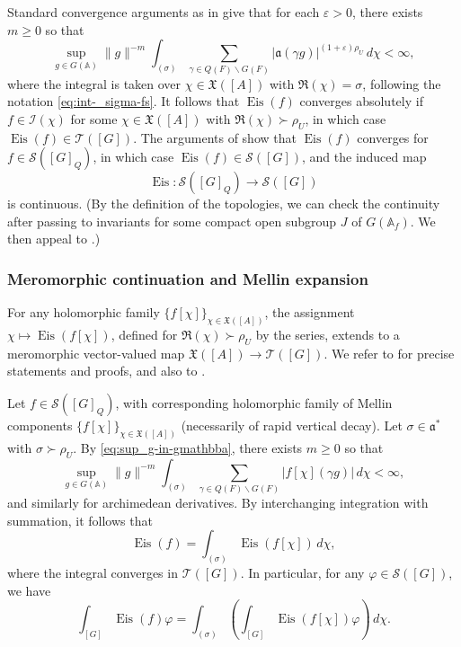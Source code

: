 \documentclass[reqno]{amsart}
\def\eps{\varepsilon}
\DeclareMathOperator{\Eis}{Eis}
\theoremstyle{plain} \newtheorem{theorem} {Theorem}
\theoremstyle{definition} \newtheorem{definition} [theorem] {Definition}
\theoremstyle{itplain} %
\numberwithin{equation}{section}
\numberwithin{theorem}{section}
\renewcommand{\geq}{\geqslant}
\begin{document}
Standard convergence arguments as in \cite[\S12]{MR2331343} give that for each $\eps > 0$, there exists $m \geq 0$ so that
\begin{equation}\label{eq:sup_g-in-gmathbba}
  \sup_{g \in G(\mathbb{A})} \|g\|^{-m}
  \int_{ (\sigma)
  }
  \sum_{\gamma \in Q(F) \backslash G(F)} |\mathfrak{a}(\gamma g)|^{(1+\eps) \rho_U} \, d \chi < \infty,
\end{equation}
where the integral is taken over $\chi \in \mathfrak{X}([A])$ with $\Re(\chi) = \sigma$, following the notation \eqref{eq:int-_sigma-fs}.  It follows that $\Eis(f)$ converges absolutely if $f \in \mathcal{I}(\chi)$ for some $\chi \in \mathfrak{X}([A])$ with $\Re(\chi) \succ \rho_U$, in which case $\Eis(f) \in \mathcal{T}([G])$.  \index{Eisenstein series!spectral, $\Eis(f)$} The arguments of \cite[\S II.1.7, II.1.10]{MR1361168} show that $\Eis(f)$ converges for $f \in \mathcal{S}([G]_Q)$, in which case $\Eis(f) \in \mathcal{S}([G])$, and the induced map
\begin{equation*}
  \Eis : \mathcal{S}([G]_Q) \rightarrow \mathcal{S}([G])
\end{equation*}
is continuous.  (By the definition of the topologies, we can check the continuity after passing to invariants for some compact open subgroup $J$ of $G(\mathbb{A}_f)$.  We then appeal to \cite[Prop 1.13]{MR1001613}.)

\subsubsection{Meromorphic continuation and Mellin expansion}
For any holomorphic family $\{f[\chi]\}_{\chi \in \mathfrak{X}([A])}$, the assignment $\chi \mapsto \Eis(f[\chi])$, defined for $\Re(\chi) \succ \rho_U$ by the series, extends to a meromorphic vector-valued map $\mathfrak{X}([A]) \rightarrow \mathcal{T}([G])$.  We refer to \cite{MR2402686} for precise statements and proofs, and also to \cite[Thm 11.7]{MR3219530}.

Let $f \in \mathcal{S}([G]_Q)$, with corresponding holomorphic family of Mellin components $\{f[\chi]\}_{\chi \in \mathfrak{X}([A])}$ (necessarily of rapid vertical decay).  Let $\sigma \in \mathfrak{a}^*$ with $\sigma \succ \rho_U$.  By \eqref{eq:sup_g-in-gmathbba}, there exists $m \geq 0$ so that
\begin{equation*}
  \sup_{g \in G(\mathbb{A})} \|g\|^{-m}
    \int_{ (\sigma)  }
 \sum_{\gamma \in Q(F) \backslash G(F)} |f[\chi](\gamma g)| \, d \chi  < \infty,
\end{equation*}
and similarly for archimedean derivatives.  By interchanging integration with summation, it follows that
\begin{equation}\label{eq:eisf-=-int}
  \Eis(f) = \int _{(\sigma) } \Eis(f[\chi]) \, d \chi,
\end{equation}
where the integral converges in $\mathcal{T}([G])$.  In particular, for any $\varphi \in \mathcal{S}([G])$, we have
\begin{equation}\label{eq:int-_g-eisf}
  \int _{[G]} \Eis(f) \varphi
  = \int _{(\sigma)}
  \left( \int _{[G]} \Eis(f[\chi]) \varphi  \right) \, d \chi.
\end{equation}
\end{document}
